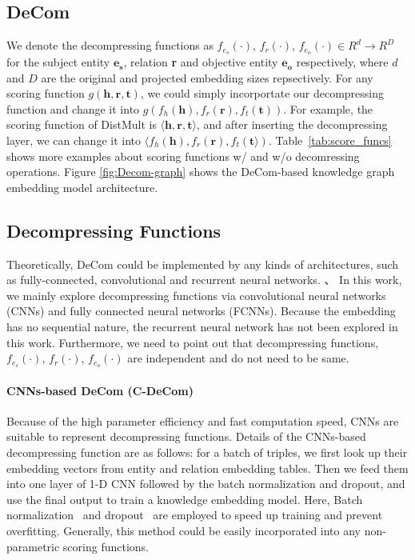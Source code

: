 \documentclass[letterpaper]{article} \usepackage{aaai20}  \usepackage{times}  \usepackage{helvet} \usepackage{courier}  \usepackage{booktabs}
\begin{document}
 \subsection{DeCom}
We denote the decompressing functions as $f_{e_{s}}(\cdot)$, $f_r(\cdot)$, $f_{e_{o}}(\cdot) \in R^d \rightarrow R^D$ for the subject entity $\mathbf{{e_{s}}}$, relation \textbf{r} and objective entity $\mathbf{{e_{o}}}$ respectively, where $d$ and $D$ are the original and projected embedding sizes repsectively. For any scoring function $g(\mathbf{h}, \mathbf{r}, \mathbf{t})$, we could simply incorportate our decompressing function and change it into $g(f_h(\mathbf{h}), f_r(\mathbf{r}), f_t(\mathbf{t}))$. For example, the scoring function of DistMult is $\langle \mathbf{h}, \mathbf{r}, \mathbf{t}\rangle$, and after inserting the decompressing layer, we can change it into $\langle f_h(\mathbf{h}), f_r(\mathbf{r}), f_t(\mathbf{t}\rangle)$. Table~\ref{tab:score_funcs} shows more examples about scoring functions w/ and w/o decomressing operations. Figure \ref{fig:Decom-graph} shows the DeCom-based knowledge graph embedding model architecture. 

\subsection{Decompressing Functions}

Theoretically, DeCom could be implemented by any kinds of architectures, such as fully-connected, convolutional and recurrent neural networks. 、 In this work, we mainly explore decompressing functions via convolutional neural networks (CNNs) and fully connected neural networks (FCNNs). 
Because the embedding has no sequential nature, the recurrent neural network has not been explored in this work. 
Furthermore, we need to point out that decompressing functions,  $f_{e_{s}}(\cdot)$, $f_r(\cdot)$, $f_{e_{o}}(\cdot)$ are independent and do not need to be same. 

\paragraph{CNNs-based DeCom (C-DeCom)}
Because of the high parameter efficiency and fast computation speed, CNNs are suitable to represent decompressing functions.
 Details of the CNNs-based decompressing function are as follows: for a batch of triples, we first look up their embedding vectors from entity and relation embedding tables. Then we feed them into one layer of 1-D CNN followed by the batch normalization and dropout, and use the final output to train a knowledge embedding model. Here, Batch normalization~\cite{ioffe2015batch} and dropout~\cite{srivastava2014dropout} are employed to speed up training and prevent overfitting. Generally, this method could be easily incorporated into any non-parametric scoring functions. 
\end{document}
